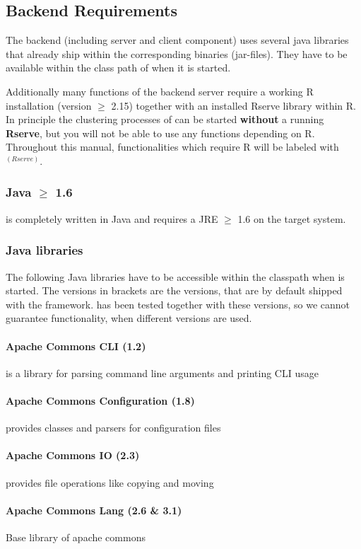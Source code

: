 		 \subsection{Backend Requirements}\label{backend_requirements}
	The backend (including server and client component) uses several java libraries that already ship within the corresponding binaries (jar-files). They have to be available within the class path of \clusteval when it is started. 
	
	Additionally many functions of the backend server require a working R installation (version $\geq$ 2.15) together with an installed Rserve library within R. In principle the clustering processes of \clusteval can be started \textbf{without} a running \textbf{Rserve}, but you will not be able to use any functions depending on R. Throughout this manual, functionalities which require R will be labeled with $^{(Rserve)}$.
	
	\subsubsection{Java $\geq$ 1.6}
	\clusteval is completely written in Java and requires a JRE $\geq$ 1.6 on the target system.
	\subsubsection{Java libraries}
	The following Java libraries have to be accessible within the classpath when \clusteval is started. The versions in brackets are the versions, that are by default shipped with the framework. \clusteval has been tested together with these versions, so we cannot guarantee functionality, when different versions are used.
	
	\paragraph{Apache Commons CLI (1.2)} is a library for parsing command line arguments and printing CLI usage
	\paragraph{Apache Commons Configuration (1.8)} provides classes and parsers for configuration files
	\paragraph{Apache Commons IO (2.3)} provides file operations like copying and moving
	\paragraph{Apache Commons Lang (2.6 \& 3.1)} Base library of apache commons
